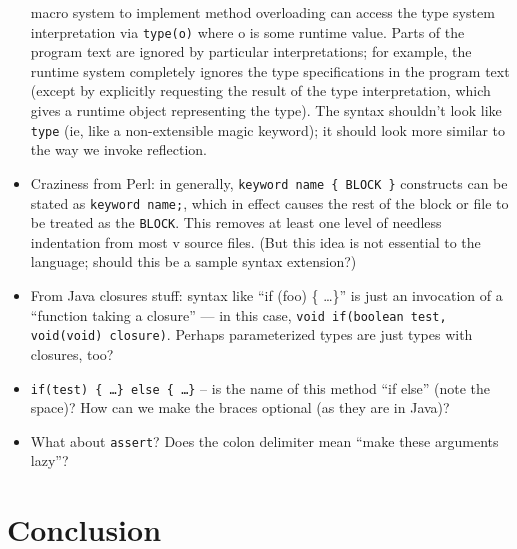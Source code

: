 \documentclass[11pt,notitlepage,twocolumn]{article}
\newcommand{\vlang}{\textsf{v}\xspace}
\begin{document}
\begin{itemize}
  macro system to implement method overloading can access the type
  system interpretation via \texttt{type(o)} where o is some runtime
  value.  Parts of the program text are ignored by particular
  interpretations; for example, the runtime system completely ignores
  the type specifications in the program text (except by explicitly
  requesting the result of the type interpretation, which gives
  a runtime object representing the type).  The syntax shouldn't look
  like \texttt{type} (ie, like a non-extensible magic keyword); it
  should look more similar to the way we invoke reflection.
\item Craziness from Perl: in generally, \texttt{keyword name \{ BLOCK \}}
  constructs can be stated as \texttt{keyword name;}, which in effect
  causes the rest of the block or file to be treated as the \texttt{BLOCK}.
  This removes at least one level of needless indentation from most
  \vlang source files. (But this idea is not essential to the
  language; should this be a sample syntax extension?)
\item From Java closures stuff: syntax like ``if (foo) \{ \ldots \}'' is
  just an invocation of a ``function taking a closure'' --- in this case,
  \texttt{void if(boolean test, void(void) closure)}.  Perhaps parameterized
  types are just types with closures, too?
\item \texttt{if(test) \{ \ldots \} else \{ \ldots \}} -- is the name
  of this method ``if else'' (note the space)? How can we make the
  braces optional (as they are in Java)?
\item What about \texttt{assert}?  Does the colon delimiter mean
  ``make these arguments lazy''?
\end{itemize}

\section{Conclusion}


\end{document}
